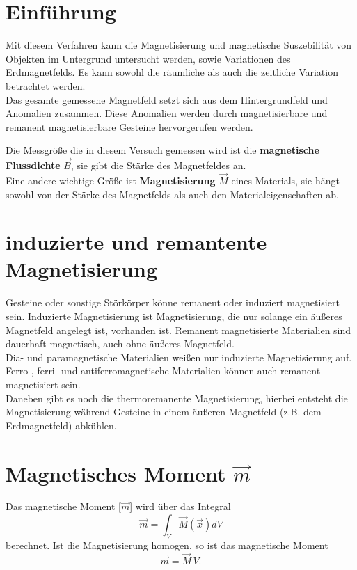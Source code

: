 \section{Einführung}

Mit diesem Verfahren kann die Magnetisierung und magnetische Suszebilität von Objekten im Untergrund untersucht werden, sowie Variationen des Erdmagnetfelds. Es kann sowohl die räumliche als auch die zeitliche Variation 
betrachtet werden.\\

Das gesamte gemessene Magnetfeld setzt sich aus dem Hintergrundfeld und Anomalien zusammen. Diese Anomalien 
 werden durch magnetisierbare und remanent magnetisierbare Gesteine hervorgerufen werden. 



Die Messgröße die in diesem Versuch gemessen wird ist die \textbf{magnetische Flussdichte} $\vec{B}$, sie gibt die Stärke des Magnetfeldes an. \\
Eine andere wichtige Größe ist \textbf{Magnetisierung} $\vec{M}$ eines Materials, sie hängt sowohl von der Stärke des Magnetfelds als auch den Materialeigenschaften ab.\\

\section{induzierte und remantente Magnetisierung}
Gesteine oder sonstige Störkörper könne remanent oder induziert magnetisiert sein. Induzierte Magnetisierung ist Magnetisierung, die nur solange ein äußeres Magnetfeld angelegt ist, vorhanden ist. Remanent magnetisierte 
Materialien sind dauerhaft magnetisch, auch ohne äußeres Magnetfeld.\\
Dia- und paramagnetische Materialien weißen nur induzierte Magnetisierung auf. Ferro-, ferri- und antiferromagnetische Materialien können auch remanent magnetisiert sein. \\
Daneben gibt es noch die thermoremanente Magnetisierung, hierbei entsteht die Magnetisierung während Gesteine in einem äußeren Magnetfeld (z.B. dem Erdmagnetfeld) abkühlen.


\section{Magnetisches Moment $\vec{m}$}
Das magnetische Moment [$\vec{m}$]  wird über das Integral
\begin{equation}
\vec{m}  = \int_V \vec{M}(\vec{x}) dV
\end{equation}
berechnet.
Ist die Magnetisierung homogen, so ist das magnetische Moment
\begin{equation}
\vec{m}  = \vec{M} \,V.
\end{equation}

